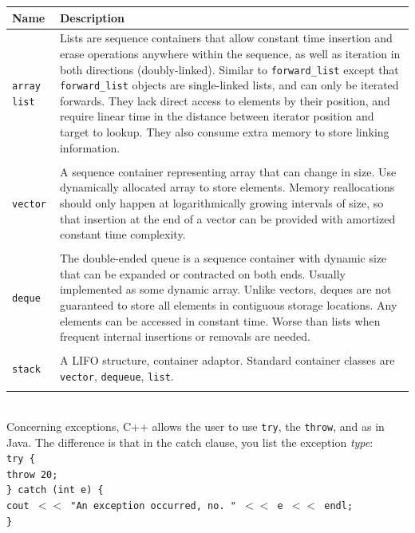  \begin{tabular}{p{}p{}}
Name & Description \\
\hline
\texttt{array}
\hfill
\texttt{list} & Lists are sequence containers that allow constant time insertion and erase operations anywhere within the sequence, as well as iteration in both directions (doubly-linked). Similar to \texttt{forward\_list} except that \texttt{forward\_list} objects are single-linked lists, and can only be iterated forwards. They lack direct access to elements by their position, and require linear time in the distance between iterator position and target to lookup. They also consume extra memory to store linking information. \\
\hfill \\
\texttt{vector} & A sequence container representing array that can change in size. Use dynamically allocated array to store elements. Memory reallocations should only happen at logarithmically growing intervals of size, so that insertion at the end of a vector can be provided with amortized constant time complexity. \\
\hfill \\
\texttt{deque} & The double-ended queue is a sequence container with dynamic size that can be expanded or contracted on both ends. Usually implemented as some dynamic array. Unlike vectors, deques are not guaranteed to store all elements in contiguous storage locations. Any elements can be accessed in constant time. Worse than lists when frequent internal insertions or removals are needed. \\
\hfill \\
\texttt{stack} & A LIFO structure, container adaptor. Standard container classes are \texttt{vector}, \texttt{dequeue}, \texttt{list}. \\
\hfill \\
\end{tabular} \\

Concerning exceptions, C++ allows the user to use \texttt{try}, the \texttt{throw}, and  as in Java. The difference is that in the catch clause, you list the exception \textit{type}: \\

\indent \texttt{try \{} \\
\indent \indent \texttt{throw 20;} \\
\indent \texttt{\} catch (int e) \{} \\
\indent \indent \texttt{cout $<<$ "An exception occurred, no. " $<<$ e $<<$ endl;} \\
\indent \texttt{\}} \\

